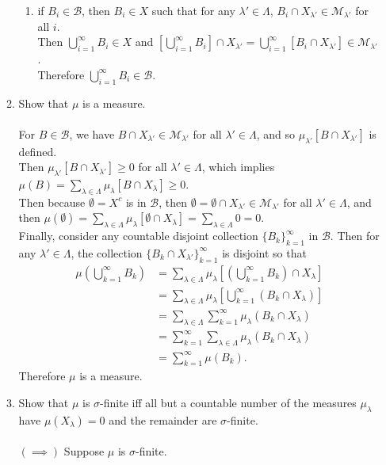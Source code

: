 \begin{enumerate}
\begin{enumerate}[label=(\roman*),align=left]
\begin{enumerate}[label=(\roman*),align=left]
			\item if $B_i\in\mathcal{B}$, then $B_i\in X$ such that for any $\lambda'\in\Lambda$, $B_i\cap X_{\lambda'}\in\mathcal{M}_{\lambda'}$ for all $i$.\\
			Then $\bigcup_{i=1}^\infty B_i\in X$ and $[\bigcup_{i=1}^\infty B_i]\cap X_{\lambda'} =\bigcup_{i=1}^\infty [B_i\cap X_{\lambda'}]\in\mathcal{M}_{\lambda'}$.
			\\Therefore $\bigcup_{i=1}^\infty B_i\in\mathcal{B}$.
		\end{enumerate}
		\item Show that $\mu$ is a measure.\\
		\\For $B\in\mathcal{B}$, we have $B\cap X_{\lambda'}\in\mathcal{M}_{\lambda'}$ for all $\lambda'\in\Lambda$, and so $\mu_{\lambda'}[B\cap X_{\lambda'}]$ is defined.
		\\Then $\mu_{\lambda'}[B\cap X_{\lambda'}]\ge0$ for all $\lambda'\in\Lambda$, which implies $\mu(B)=\sum_{\lambda\in\Lambda}\mu_\lambda[B\cap X_\lambda]\ge0$.
		\\Then because $\emptyset=X^c$ is in $\mathcal{B}$, then $\emptyset=\emptyset\cap X_{\lambda'}\in\mathcal{M}_{\lambda'}$ for all $\lambda'\in\Lambda$, and then $\mu(\emptyset)=\sum_{\lambda\in\Lambda}\mu_\lambda[\emptyset\cap X_\lambda]=\sum_{\lambda\in\Lambda}0=0$.
		\\Finally, consider any countable disjoint collection $\{B_k\}_{k=1}^\infty$ in $\mathcal{B}$.
		Then for any $\lambda'\in\Lambda$, the collection $\{B_k\cap X_{\lambda'}\}_{k=1}^\infty$ is disjoint so that 
		\begin{align*}
			\mu(\bigcup_{k=1}^\infty B_k)&= \sum_{\lambda\in\Lambda}\mu_\lambda[(\bigcup_{k=1}^\infty B_k)\cap X_\lambda]\\
			&=\sum_{\lambda\in\Lambda}\mu_\lambda[\bigcup_{k=1}^\infty (B_k\cap X_\lambda)]\\
			&=\sum_{\lambda\in\Lambda}\sum_{k=1}^\infty \mu_\lambda(B_k\cap X_\lambda)\\
			&=\sum_{k=1}^\infty \sum_{\lambda\in\Lambda} \mu_\lambda(B_k\cap X_\lambda)\\
			&=\sum_{k=1}^\infty \mu(B_k).
		\end{align*}
		Therefore $\mu$ is a measure.
		\item Show that $\mu$ is $\sigma$-finite iff all but a countable number of the measures $\mu_\lambda$ have $\mu(X_\lambda)=0$ and the remainder are $\sigma$-finite.\\
		\\$(\implies)$ Suppose $\mu$ is $\sigma$-finite.\\

\end{enumerate}
\end{enumerate}
